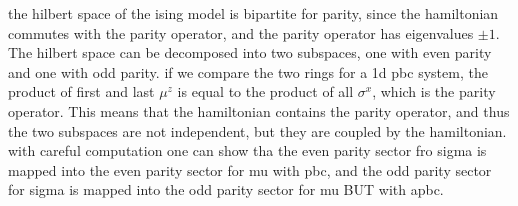 the hilbert space of the ising model is bipartite for parity, since the hamiltonian commutes with the parity operator, and the parity operator has eigenvalues \(\pm 1\). The hilbert space can be decomposed into two subspaces, one with even parity and one with odd parity. if we compare the two rings for a 1d pbc system, the product of first and last \(\mu^z\) is equal to the product of all \(\sigma^x\), which is the parity operator. This means that the hamiltonian contains the parity operator, and thus the two subspaces are not independent, but they are coupled by the hamiltonian. with careful computation one can show tha the even parity sector fro sigma is mapped into the even parity sector for mu with pbc, and the odd parity sector for sigma is mapped into the odd parity sector for mu BUT with apbc.